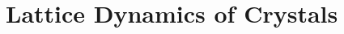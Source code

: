 \documentclass[10.75pt,a4paper,openright,bottom=2cm]{article}
\renewcommand{\Vec}[1]{\boldsymbol{#1}}
\begin{document}
\newpage
\section{Lattice Dynamics of Crystals}
\end{document}
